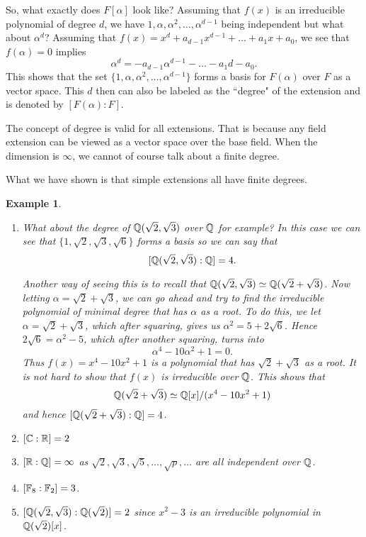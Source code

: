 \documentclass[12pt]{article}
\theoremstyle{plain}
\newtheorem{example}{Example}
\theoremstyle{definition}
\theoremstyle{remark}
\begin{document}
So, what exactly does $F[\alpha]$ look like?
Assuming that $f(x)$ is an irreducible polynomial of degree $d$, we have $1, \alpha, \alpha^2, \dots, \alpha^{d-1}$ being independent but what about $\alpha^d$? Assuming that $f(x)=x^d+a_{d-1}x^{d-1}+\dots +a_1x+a_0$, we see that $f(\alpha)=0$ implies
$$\alpha^d=-a_{d-1}\alpha^{d-1}-\dots -a_1d-a_0.$$
This shows that the set $\{1, \alpha, \alpha^2, \dots, \alpha^{d-1}\}$ forms a basis for $F(\alpha)$ over $F$
as a vector space. This $d$ then can also be labeled as the ``degree" of the extension and is denoted by $[F(\alpha):F]$.

The concept of degree is valid for all extensions. That is because any field extension can be viewed as a vector space over the base field. When the dimension is $\infty$, we cannot of course talk about a finite degree.

What we have shown is that simple extensions all have finite degrees.

\begin{example}
\begin{enumerate}
 \item What about the degree of $\mathbb{Q}(\sqrt{2}, \sqrt{3})$ over $\mathbb{Q}$ for example? In this case we can see that $\{1, \sqrt{2}, \sqrt{3}, \sqrt{6}\}$ forms a basis so we can say that
 $$[\mathbb{Q}(\sqrt{2}, \sqrt{3}):\mathbb{Q}]=4.$$

 Another way of seeing this is to recall that $\mathbb{Q}(\sqrt{2}, \sqrt{3}) \simeq \mathbb{Q}(\sqrt{2}+\sqrt{3})$. Now letting $\alpha=\sqrt{2}+\sqrt{3}$, we can go ahead and try to find the irreducible polynomial of minimal degree that has $\alpha$ as a root. To do this, we let
 $\alpha=\sqrt{2}+\sqrt{3}$, which after squaring, gives us
 $\alpha^2=5+2\sqrt{6}$. Hence $2\sqrt{6}=\alpha^2-5$, which after another squaring, turns into
 $$\alpha^4-10\alpha^2+1=0.$$
 Thus $f(x)=x^4-10x^2+1$ is a polynomial that has $\sqrt{2}+\sqrt{3}$ as a root. It is not hard to show that $f(x)$ is irreducible over $\mathbb{Q}$. This shows that
 $$\mathbb{Q}(\sqrt{2}+\sqrt{3}) \simeq \mathbb{Q}[x]/(x^4-10x^2+1)$$ and hence
 $[\mathbb{Q}(\sqrt{2}+\sqrt{3}):\mathbb{Q}]=4$.
\item $[\mathbb{C}:\mathbb{R}]=2$
\item $[\mathbb{R}:\mathbb{Q}]=\infty$ as $\sqrt{2}, \sqrt{3}, \sqrt{5}, \dots, \sqrt{p}, \dots$ are all independent over $\mathbb{Q}$.
\item $[\mathbb{F}_8:\mathbb{F}_2]=3$.
\item $[\mathbb{Q}(\sqrt{2}, \sqrt{3}):\mathbb{Q}(\sqrt{2})]=2$ since $x^2-3$ is an irreducible polynomial in $\mathbb{Q}(\sqrt{2})[x]$.
\end{enumerate}
 \end{example}
\end{document}
